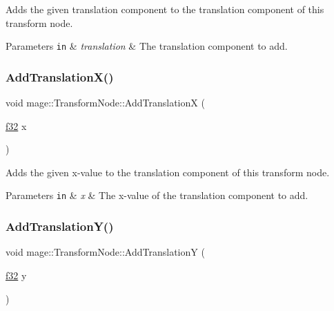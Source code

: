 Adds the given translation component to the translation component of this transform node.


\begin{DoxyParams}[1]{Parameters}
\mbox{\tt in}  & {\em translation} & The translation component to add. \\
\hline
\end{DoxyParams}
\hypertarget{structmage_1_1_transform_node_aa6b2b108ebb521034c095ba1ffa05e09}{}\label{structmage_1_1_transform_node_aa6b2b108ebb521034c095ba1ffa05e09} 
\subsubsection{\texorpdfstring{Add\+Translation\+X()}{AddTranslationX()}}
{\footnotesize\ttfamily void mage\+::\+Transform\+Node\+::\+Add\+TranslationX (\begin{DoxyParamCaption}\item[{\hyperlink{namespacemage_a6a44ad388483959dc4dff9f2aef91431}{f32}}]{x }\end{DoxyParamCaption})\hspace{0.3cm}{\ttfamily [noexcept]}}

Adds the given x-\/value to the translation component of this transform node.


\begin{DoxyParams}[1]{Parameters}
\mbox{\tt in}  & {\em x} & The x-\/value of the translation component to add. \\
\hline
\end{DoxyParams}
\hypertarget{structmage_1_1_transform_node_a1f2102bd9c7027db8315c21e3bbb0eac}{}\label{structmage_1_1_transform_node_a1f2102bd9c7027db8315c21e3bbb0eac} 
\subsubsection{\texorpdfstring{Add\+Translation\+Y()}{AddTranslationY()}}
{\footnotesize\ttfamily void mage\+::\+Transform\+Node\+::\+Add\+TranslationY (\begin{DoxyParamCaption}\item[{\hyperlink{namespacemage_a6a44ad388483959dc4dff9f2aef91431}{f32}}]{y }\end{DoxyParamCaption})\hspace{0.3cm}{\ttfamily [noexcept]}}


